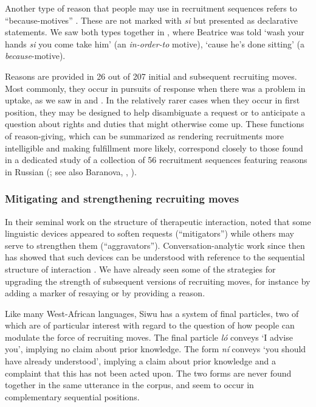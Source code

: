 \documentclass[output=paper]{langsci/langscibook}
\begin{document}
Another type of reason that people may use in recruitment sequences refers to “because-motives” \citep{schutz_common-sense_1962}. These are not marked with \textit{si} but presented as declarative statements. We saw both types together in , where Beatrice was told ‘wash your hands \textit{si} you come take him’ (an \textit{in-order-to} motive), ‘cause he’s done sitting’ (a \textit{because}-motive).

Reasons are provided in 26 out of 207 initial and subsequent recruiting moves. Most commonly, they occur in pursuits of response when there was a problem in uptake, as we saw in   and  . In the relatively rarer cases when they occur in first position, they may be designed to help disambiguate a request  or to anticipate a question about rights and duties that might otherwise come up. These functions of reason-giving, which can be summarized as rendering recruitments more intelligible and making fulfillment more likely, correspond closely to those found in a dedicated study of a collection of 56 recruitment sequences featuring reasons in Russian (\citealt{BaranovaDingemanse2016}; see also Baranova, , ).

\subsubsection{Mitigating and strengthening recruiting moves}\label{sec:dingemanse:3.3.3}

In their seminal work on the structure of therapeutic interaction, \citet{LabovFanshel1977} noted that some linguistic devices appeared to soften requests (“mitigators”) while others may serve to strengthen them (“aggravators”). Conver\-sa\-tion-analytic work since then has showed that such devices can be understood with reference to the sequential structure of interaction \citep{heritage_garfinkel_1984,schegloff_sequence_2007}. We have already seen some of the strategies for upgrading the strength of subsequent versions of recruiting moves, for instance by adding a marker of resaying or by providing a reason.

Like many West-African languages, Siwu has a system of final particles, two of which are of particular interest with regard to the question of how people can modulate the force of recruiting moves. The final particle \textit{ló} conveys ‘I advise you’, implying no claim about prior knowledge. The form \textit{ní} conveys ‘you should have already understood’, implying a claim about prior knowledge and a complaint that this has not been acted upon. The two forms are never found together in the same utterance in the corpus, and seem to occur in complementary sequential positions.
\end{document}
